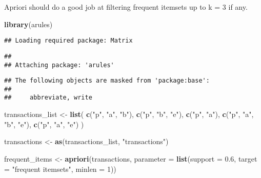\documentclass[
]{article}
\newenvironment{Shaded}{\begin{snugshade}}{\end{snugshade}}
\newcommand{\AttributeTok}[1]{\textcolor[rgb]{0.13,0.29,0.53}{#1}}
\newcommand{\DecValTok}[1]{\textcolor[rgb]{0.00,0.00,0.81}{#1}}
\newcommand{\FloatTok}[1]{\textcolor[rgb]{0.00,0.00,0.81}{#1}}
\newcommand{\FunctionTok}[1]{\textcolor[rgb]{0.13,0.29,0.53}{\textbf{#1}}}
\newcommand{\NormalTok}[1]{#1}
\newcommand{\OtherTok}[1]{\textcolor[rgb]{0.56,0.35,0.01}{#1}}
\newcommand{\StringTok}[1]{\textcolor[rgb]{0.31,0.60,0.02}{#1}}
\begin{document}
Apriori should do a good job at filtering frequent itemsets up to k = 3
if any.

\begin{Shaded}
\begin{Highlighting}[]
\FunctionTok{library}\NormalTok{(arules)}
\end{Highlighting}
\end{Shaded}

\begin{verbatim}
## Loading required package: Matrix
\end{verbatim}

\begin{verbatim}
## 
## Attaching package: 'arules'
\end{verbatim}

\begin{verbatim}
## The following objects are masked from 'package:base':
## 
##     abbreviate, write
\end{verbatim}

\begin{Shaded}
\begin{Highlighting}[]
\NormalTok{transactions\_list }\OtherTok{\textless{}{-}} \FunctionTok{list}\NormalTok{(}
  \FunctionTok{c}\NormalTok{(}\StringTok{"p"}\NormalTok{, }\StringTok{"a"}\NormalTok{, }\StringTok{"b"}\NormalTok{),       }
  \FunctionTok{c}\NormalTok{(}\StringTok{"p"}\NormalTok{, }\StringTok{"b"}\NormalTok{, }\StringTok{"e"}\NormalTok{),      }
  \FunctionTok{c}\NormalTok{(}\StringTok{"p"}\NormalTok{, }\StringTok{"a"}\NormalTok{),           }
  \FunctionTok{c}\NormalTok{(}\StringTok{"p"}\NormalTok{, }\StringTok{"a"}\NormalTok{, }\StringTok{"b"}\NormalTok{, }\StringTok{"e"}\NormalTok{), }
  \FunctionTok{c}\NormalTok{(}\StringTok{"p"}\NormalTok{, }\StringTok{"a"}\NormalTok{, }\StringTok{"e"}\NormalTok{)       }
\NormalTok{)}

\NormalTok{transactions }\OtherTok{\textless{}{-}} \FunctionTok{as}\NormalTok{(transactions\_list, }\StringTok{"transactions"}\NormalTok{)}

\NormalTok{frequent\_items }\OtherTok{\textless{}{-}} \FunctionTok{apriori}\NormalTok{(transactions, }\AttributeTok{parameter =} \FunctionTok{list}\NormalTok{(}\AttributeTok{support =} \FloatTok{0.6}\NormalTok{, }\AttributeTok{target =} \StringTok{"frequent itemsets"}\NormalTok{, }\AttributeTok{minlen =} \DecValTok{1}\NormalTok{))}
\end{Highlighting}
\end{Shaded}
\end{document}
